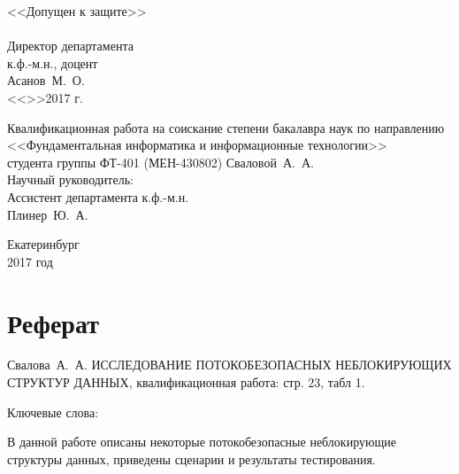 \documentclass[12pt]{article}
\begin{document}
{		\hspace{-1cm}
		\begin{minipage}{80mm}
			\noindent
			\vspace{-2.3cm}
			\begin{flushleft}
				\begin{spacing}{1.0}
				\large <<Допущен к защите>>\\
				\underline{\hspace{6cm}}\\
				\large Директор департамента\\
				\large к.ф.-м.н., доцент\\
				\large Асанов~М.~О.
				\underline{\hspace{6cm}}\\
				<<\underline{\hspace{0.7cm}}>>\underline{\hspace{3cm}}2017 г.
				\end{spacing}
			\end{flushleft}
		\end{minipage}
		\begin{minipage}{90mm}
			\begin{flushleft}
				\begin{spacing}{1.0}
				\large Квалификационная работа на соискание степени бакалавра наук по направлению\\
				\large <<Фундаментальная информатика и информационные технологии>>\\
				\large студента группы ФТ-401 (МЕН-430802) Сваловой~А.~А.\\
				\large Научный руководитель:\\
				\large Ассистент департамента к.ф.-м.н.\\
				\large Плинер~Ю.~А.
				\end{spacing}
			\end{flushleft}
		\end{minipage}
		
		\vfill
		
		\begin{center}
			Екатеринбург\\
			2017 год
		\end{center}
	}

	\newpage
	
	{\pagestyle{plain}
		\tableofcontents
	}

	\newpage
	
	\section{Реферат}
		\par Свалова~А.~А. ИССЛЕДОВАНИЕ ПОТОКОБЕЗОПАСНЫХ НЕБЛОКИРУЮЩИХ СТРУКТУР ДАННЫХ, квалификационная работа: стр. 23, табл 1.
		\par Ключевые слова: 
		\par В данной работе описаны некоторые потокобезопасные неблокирующие структуры данных, приведены сценарии и результаты тестирования.
	
\end{document}
